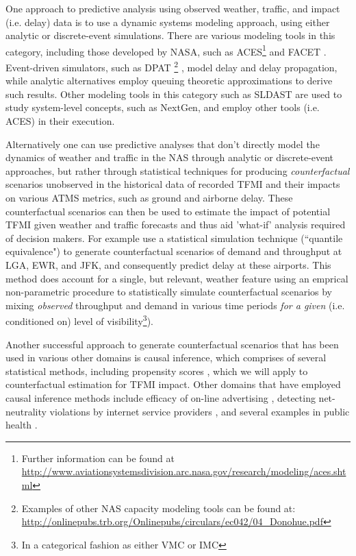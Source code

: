 \documentclass[11pt]{scrartcl}
\begin{document}
One approach to predictive analysis using observed weather, traffic, and impact (i.e. delay) data is to use a dynamic systems modeling approach, using either analytic or discrete-event simulations.  There are various modeling tools in this category, including those developed by NASA, such as ACES\footnote{Further information can be found at \url{http://www.aviationsystemsdivision.arc.nasa.gov/research/modeling/aces.shtml}} and FACET \cite{facet}.  Event-driven simulators, such as DPAT \footnote{Examples of other NAS capacity modeling tools can be found at: \url{http://onlinepubs.trb.org/Onlinepubs/circulars/ec042/04_Donohue.pdf}} \cite{wieland1997limits,schaefer2001flight}, model delay and delay propagation, while analytic alternatives employ queuing theoretic approximations \cite{kim2009air,sengupta2010computational} to derive such results. Other modeling tools in this category such as SLDAST \cite{bardina2011nasa} are used to study system-level concepts, such as  NextGen, and employ other tools (i.e. ACES) in their execution.   

Alternatively one can use predictive analyses that don't directly model the dynamics of weather and traffic in the NAS through analytic or discrete-event approaches, but rather through statistical techniques for producing \emph{counterfactual} scenarios unobserved in the historical data of recorded TFMI and their impacts on various ATMS metrics, such as ground and airborne delay.  These counterfactual scenarios can then be used to estimate the impact of potential TFMI given weather and traffic forecasts and thus aid 'what-if' analysis required of decision makers.  For example\cite{kim2013} use a statistical simulation technique (``quantile equivalence") to generate counterfactual scenarios of demand and throughput at LGA, EWR, and JFK, and consequently predict delay at these airports.  This method does account for a single, but relevant, weather feature using an emprical non-parametric procedure to statistically simulate counterfactual scenarios by mixing \emph{observed} throughput and demand in various time periods \emph{for a given} (i.e. conditioned on) level of visibility\footnote{In a categorical fashion as either VMC or IMC}).  


Another successful approach to generate counterfactual scenarios that has been used in various other domains is causal inference, which comprises of several statistical methods, including propensity scores \cite{austin2011introduction}, which we will apply to counterfactual estimation for TFMI impact.  Other domains that have employed causal inference methods include efficacy of on-line advertising \cite{bottou2013counterfactual}, detecting net-neutrality violations by internet service providers \cite{tariq2009detecting}, and several examples in public health \cite{victora2004evidence}.    
\end{document}
